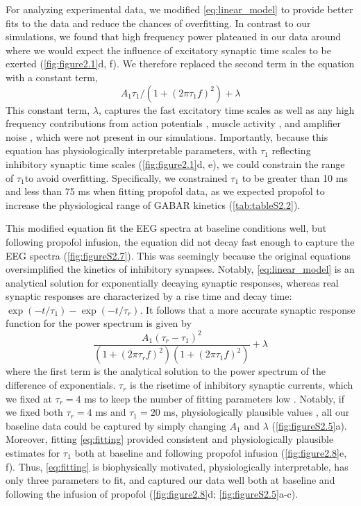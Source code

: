 For analyzing experimental data, we modified \ref{eq:linear_model} to provide better fits to the data and reduce the chances of overfitting. In contrast to our simulations, we found that high frequency power plateaued in our data around where we would expect the influence of excitatory synaptic time scales to be exerted (\autoref{fig:figure2.1}d, f). We therefore replaced the second term in the equation with a constant term,
\begin{equation}\label{eq:fitting_no_tau2}
A_1\tau_1/\left(1+\left(2\pi\tau_1f\right)^2\right)+\lambda    
\end{equation}
This constant term, $\lambda$, captures the fast excitatory time scales as well as any high frequency contributions from action potentials \cite{Buzsaki2012}, muscle activity \cite{Muthukumaraswamy2013}, and amplifier noise \cite{Miller2009}, which were not present in our simulations.  Importantly, because this equation has physiologically interpretable parameters, with $\tau_1$ reflecting inhibitory synaptic time scales (\autoref{fig:figure2.1}d, e), we could constrain the range of $\tau_1 $to avoid overfitting. Specifically, we constrained $\tau_1$ to be greater than 10 ms and less than 75 ms when fitting propofol data, as we expected propofol to increase the physiological range of GABAR kinetics (\autoref{tab:tableS2.2}). 

This modified equation fit the EEG spectra at baseline conditions well, but following propofol infusion, the equation did not decay fast enough to capture the EEG spectra (\autoref{fig:figureS2.7}). This was seemingly because the original equations oversimplified the kinetics of inhibitory synapses. Notably, \ref{eq:linear_model} is an analytical solution for exponentially decaying synaptic responses, whereas real synaptic responses are characterized by a rise time and decay time: $\exp{\left(-t/\tau_1\right)}-\exp\left(-t/\tau_r\right)$. It follows that a more accurate synaptic response function for the power spectrum is given by
\begin{equation}\label{eq:fitting}
\frac{A_1\left(\tau_r-\tau_1\right)^2}{\left(1+\left(2\pi\tau_rf\right)^2\right)\left(1+\left(2\pi\tau_1f\right)^2\right)}+\lambda
\end{equation}
where the first term is the analytical solution to the power spectrum of the difference of exponentials. $\tau_r$ is the risetime of inhibitory synaptic currents, which we fixed at $\tau_r=4$ ms to keep the number of fitting parameters low \cite{Sceniak2008}. Notably, if we fixed both $\tau_r=4$ ms and $\tau_1=20$ ms, physiologically plausible values \cite{Sceniak2008}, all our baseline data could be captured by simply changing $A_1$ and $\lambda$ (\autoref{fig:figureS2.5}a). Moreover, fitting \ref{eq:fitting} provided consistent and physiologically plausible estimates for $\tau_1$ both at baseline and following propofol infusion (\autoref{fig:figure2.8}e, f). Thus, \ref{eq:fitting} is biophysically motivated, physiologically interpretable, has only three parameters to fit, and captured our data well both at baseline and following the infusion of propofol (\autoref{fig:figure2.8}d; \autoref{fig:figureS2.5}a-c). 

